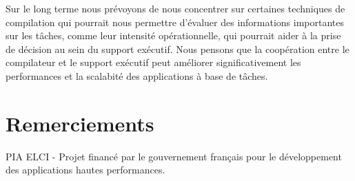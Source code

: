 \documentclass[parallelisme]{compas2016}
\begin{document}
Sur le long terme nous prévoyons de nous concentrer sur certaines techniques
de compilation qui pourrait nous permettre d'évaluer des informations
importantes sur les tâches, comme leur intensité opérationnelle, qui pourrait
aider à la prise de décision au sein du support exécutif. Nous pensons
que la coopération entre le compilateur et le support exécutif peut améliorer
significativement les performances et la scalabité des applications à base de tâches.

\vspace*{-2ex}
\section*{Remerciements}

PIA ELCI - Projet financé par le gouvernement français pour le développement
des applications hautes performances.


\end{document}
